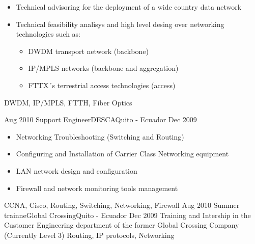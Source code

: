 \begin{experiences}
{\begin{itemize}
                        \item Technical advisoring for the deployment of a wide country data network
                        \item Technical feasibility analisys and high level desing over networking technologies such as:
                        \begin{itemize}
                        \item DWDM transport network (backbone)
                        \item IP/MPLS networks (backbone and aggregation)
                        \item FTTX´s terrestrial access technologies (access)                                            
                        \end{itemize}
                      \end{itemize}
                  }
                  {DWDM, IP/MPLS, FTTH, Fiber Optics}  

  \emptySeparator         
  \experience
  {Aug 2010}  {Support Engineer}{DESCA}{Quito - Ecuador}
  {Dec 2009}   {
                      \begin{itemize}
                        \item Networking Troubleshooting (Switching and Routing)
                        \item Configuring and Installation of Carrier Class Networking equipment
                        \item LAN network design and configuration
                        \item Firewall and network monitoring tools management
                      \end{itemize}
                }
                  {CCNA, Cisco, Routing, Switching, Networking, Firewall} 
  \emptySeparator         
  \experience
  {Aug 2010}  {Summer trainne}{Global Crossing}{Quito - Ecuador}
  {Dec 2009}   {
                Training and Intership in the Customer Engineering department of the former Global Crossing Company (Currently Level 3)
                }
                  {Routing, IP protocols, Networking} 
\end{experiences}

